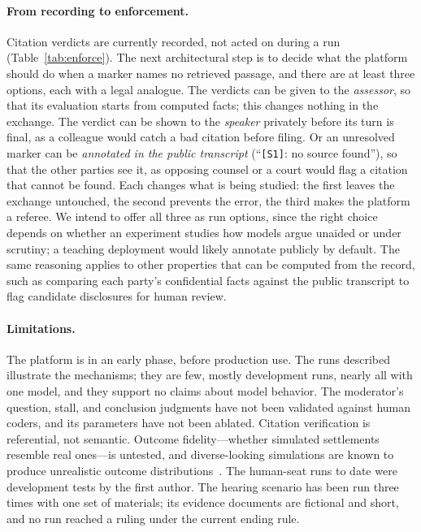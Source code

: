 \documentclass[acmsmall,screen,review]{acmart}
\newcommand{\mk}[1]{\texttt{[#1]}}
\begin{document}
\paragraph{From recording to enforcement.}
Citation verdicts are currently recorded, not acted on during a run (Table~\ref{tab:enforce}). The next architectural step is to decide what the platform should do when a marker names no retrieved passage, and there are at least three options, each with a legal analogue. The verdicts can be given to the \emph{assessor}, so that its evaluation starts from computed facts; this changes nothing in the exchange. The verdict can be shown to the \emph{speaker} privately before its turn is final, as a colleague would catch a bad citation before filing. Or an unresolved marker can be \emph{annotated in the public transcript} (``\mk{S1}: no source found''), so that the other parties see it, as opposing counsel or a court would flag a citation that cannot be found. Each changes what is being studied: the first leaves the exchange untouched, the second prevents the error, the third makes the platform a referee. We intend to offer all three as run options, since the right choice depends on whether an experiment studies how models argue unaided or under scrutiny; a teaching deployment would likely annotate publicly by default. The same reasoning applies to other properties that can be computed from the record, such as comparing each party's confidential facts against the public transcript to flag candidate disclosures for human review.

\paragraph{Limitations.}
The platform is in an early phase, before production use. The runs described illustrate the mechanisms; they are few, mostly development runs, nearly all with one model, and they support no claims about model behavior. The moderator's question, stall, and conclusion judgments have not been validated against human coders, and its parameters have not been ablated. Citation verification is referential, not semantic. Outcome fidelity---whether simulated settlements resemble real ones---is untested, and diverse-looking simulations are known to produce unrealistic outcome distributions~\cite{andric2026diversity}. The human-seat runs to date were development tests by the first author. The hearing scenario has been run three times with one set of materials; its evidence documents are fictional and short, and no run reached a ruling under the current ending rule.
\end{document}
